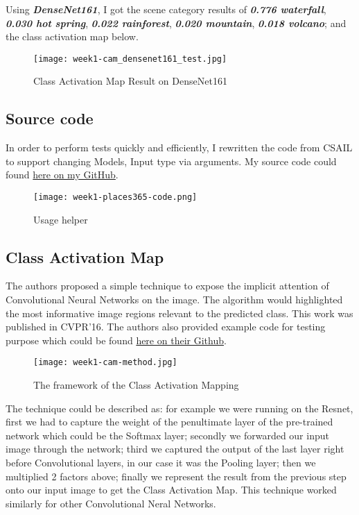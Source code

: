 Using \textbf{\emph{DenseNet161}}, I got the scene category results of \textbf{\emph{0.776 waterfall}}, \textbf{\emph{0.030 hot spring}}, \textbf{\emph{0.022 rainforest}}, \textbf{\emph{0.020 mountain}}, \textbf{\emph{0.018 volcano}}; and the class activation map below.

\begin{figure}[!ht]
\centering
\texttt{[image: week1-cam\_densenet161\_test.jpg]}
\caption{Class Activation Map Result on DenseNet161}
\end{figure}


\subsection{Source code}
In order to perform tests quickly and efficiently, I rewritten the code from CSAIL to support changing Models, Input type via arguments. My source code could found \href{https://github.com/tlvu2697/places365/blob/tlvu2697/run_placesCNN_args.py}{here on my GitHub}.

\begin{figure}[!ht]
\centering
\texttt{[image: week1-places365-code.png]}
\caption{Usage helper}
\end{figure}

\subsection{Class Activation Map}
The authors proposed a simple technique to expose the implicit attention\cite{cam} of Convolutional Neural Networks on the image. The algorithm would highlighted the most informative image regions relevant to the predicted class. This work was published in CVPR'16. The authors also provided example code for testing purpose which could be found \href{https://github.com/metalbubble/CAM}{here on their Github}.

\begin{figure}[!ht]
\centering
\texttt{[image: week1-cam-method.jpg]}
\caption{The framework of the Class Activation Mapping}
\end{figure}

The technique could be described as: for example we were running on the Resnet, first we had to capture the weight of the penultimate layer of the pre-trained network which could be the Softmax layer; secondly we forwarded our input image through the network; third we captured the output of the last layer right before Convolutional layers, in our case it was the Pooling layer; then we multiplied 2 factors above; finally we represent the result from the previous step onto our input image to get the Class Activation Map. This technique worked similarly for other Convolutional Neral Networks.

